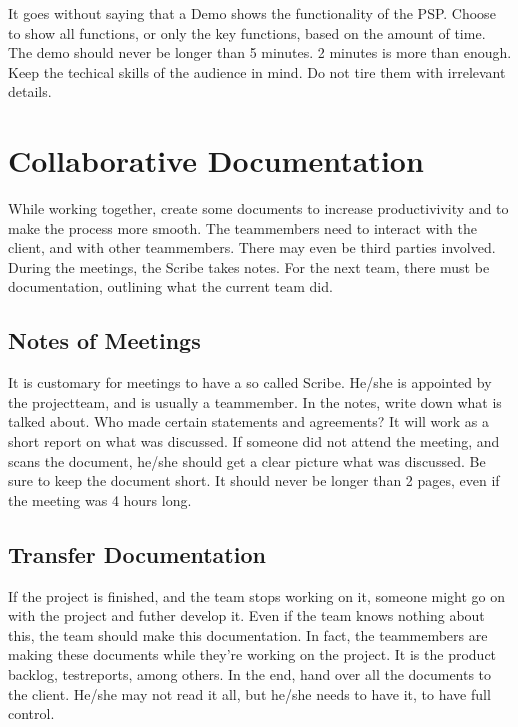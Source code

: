 \documentclass[10pt]{report}
\begin{document}
It goes without saying that a Demo shows the functionality of the PSP. Choose to show all functions, or only the key functions, based on the amount of time. The demo should never be longer than 5 minutes. 2 minutes is more than enough. Keep the techical skills of the audience in mind. Do not tire them with irrelevant details.

\newpage

\chapter{Collaborative Documentation}
\thispagestyle{fancy}

While working together, create some documents to increase productivivity and to make the process more smooth. The teammembers need to interact with the client, and with other teammembers. There may even be third parties involved. During the meetings, the Scribe takes notes. For the next team, there must be documentation, outlining what the current team did.

\medskip
\minitoc

\newpage

\section{Notes of Meetings}

It is customary for meetings to have a so called Scribe. He/she is appointed by the projectteam, and is usually a teammember. In the notes, write down what is talked about. Who made certain statements and agreements? It will work as a short report on what was discussed. If someone did not attend the meeting, and scans the document, he/she should get a clear picture what was discussed. Be sure to keep the document short. It should never be longer than 2 pages, even if the meeting was 4 hours long.

\newpage

% 
%

\section{Transfer Documentation}

If the project is finished, and the team stops working on it, someone might go on with the project and futher develop it. Even if the team knows nothing about this, the team should make this documentation. In fact, the teammembers are making these documents while they're working on the project. It is the product backlog, testreports, among others. In the end, hand over all the documents to the client. He/she may not read it all, but he/she needs to have it, to have full control. 
\end{document}
